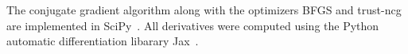 The conjugate gradient algorithm along with the optimizers BFGS and trust-ncg
are implemented in SciPy~\citep{scipy}.
All derivatives were computed using the Python
automatic differentiation libarary Jax~\citep{jax2018github}.



